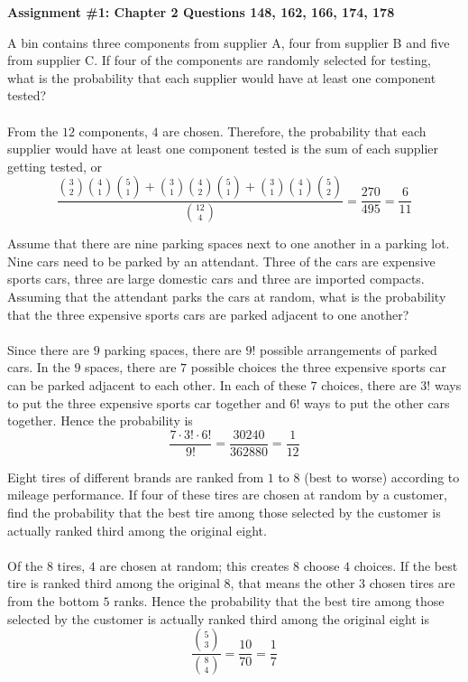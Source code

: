 \documentclass[12pt]{article}
\newcommand{\ques}[1]{\noindent {\bf Question #1: }}
\begin{document}
\begin{center} \textbf{Assignment \#1: Chapter 2 Questions 148, 162, 166, 174, 178} \end{center}

\ques{2.148} 

A bin contains three components from supplier A, four from supplier B and five from supplier C. If four of the components are randomly selected for testing, what is the probability that each supplier would have at least one component tested? \\~\\
From the $12$ components, $4$ are chosen. Therefore, the probability that each supplier would have at least one component tested is the sum of each supplier getting tested, or  
$$ \frac{ \binom{3}{2}\binom{4}{1}\binom{5}{1} + \binom{3}{1}\binom{4}{2}\binom{5}{1} + \binom{3}{1}\binom{4}{1}\binom{5}{2}}{\binom{12}{4}} = \frac{270}{495} = \frac{6}{11} $$ 


\ques{2.162}

Assume that there are nine parking spaces next to one another in a parking lot. Nine cars need to be parked by an attendant. Three of the cars are expensive sports cars, three are large domestic cars and three are imported compacts. Assuming that the attendant parks the cars at random, what is the probability that the three expensive sports cars are parked adjacent to one another? \\~\\
Since there are $9$ parking spaces, there are $9!$ possible arrangements of parked cars. In the $9$ spaces, there are $7$ possible choices the three expensive sports car can be parked adjacent to each other. In each of these $7$ choices, there are $3!$ ways to put the three expensive sports car together and $6!$ ways to put the other cars together. Hence the probability is $$ \frac{7 \cdot 3! \cdot 6!}{9!} = \frac{30240}{362880} = \frac{1}{12} $$ 


\ques{2.166}

Eight tires of different brands are ranked from $1$ to $8$ (best to worse) according to mileage performance. If four of these tires are chosen at random by a customer, find the probability that the best tire among those selected by the customer is actually ranked third among the original eight. \\~\\
Of the $8$ tires, $4$ are chosen at random; this creates $8$ choose $4$ choices. If the best tire is ranked third among the original $8$, that means the other $3$ chosen tires are from the bottom $5$ ranks. Hence the probability that the best tire among those selected by the customer is actually ranked third among the original eight is $$ \frac{\binom{5}{3}}{\binom{8}{4}} = \frac{10}{70} = \frac{1}{7} $$ 
\end{document}
